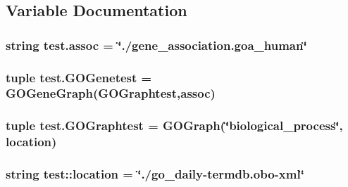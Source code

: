 \subsection{Variable Documentation}
\hypertarget{namespacetest_adb8b1e2a5df72522e42bc012571e75cd}{
\subsubsection[{assoc}]{\setlength{\rightskip}{0pt plus 5cm}string {\bf test.assoc} = \char`\"{}./gene\_\-association.goa\_\-human\char`\"{}}}
\label{namespacetest_adb8b1e2a5df72522e42bc012571e75cd}
\hypertarget{namespacetest_ab48a47ac8dcf21d32cff24c492f085c1}{
\subsubsection[{GOGenetest}]{\setlength{\rightskip}{0pt plus 5cm}tuple {\bf test.GOGenetest} = {\bf GOGeneGraph}({\bf GOGraphtest},{\bf assoc})}}
\label{namespacetest_ab48a47ac8dcf21d32cff24c492f085c1}
\hypertarget{namespacetest_a49256f3800de70e9aabf11ea0c3bb8e1}{
\subsubsection[{GOGraphtest}]{\setlength{\rightskip}{0pt plus 5cm}tuple {\bf test.GOGraphtest} = {\bf GOGraph}(\char`\"{}biological\_\-process\char`\"{}, location)}}
\label{namespacetest_a49256f3800de70e9aabf11ea0c3bb8e1}
\hypertarget{namespacetest_a4ee7d63d9426ae32ba96ad2f0e171511}{
\subsubsection[{location}]{\setlength{\rightskip}{0pt plus 5cm}string {\bf test::location} = \char`\"{}./go\_\-daily-\/termdb.obo-\/xml\char`\"{}}}
\label{namespacetest_a4ee7d63d9426ae32ba96ad2f0e171511}

